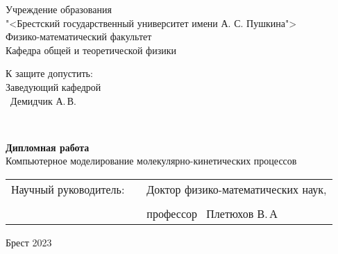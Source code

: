 \thispagestyle{empty}

\begin{center}
    Учреждение образования \\
"<Брестский государственный университет имени А. С. Пушкина"> \\
Физико-математический факультет \\
Кафедра общей и теоретической физики \\


    \vspace{20pt}
\end{center}

\begin{flushright}
    \begin{minipage}{0.4\textwidth}
      К защите допустить:\\[0.8em]
      Заведующий кафедрой \\[0.45em]
      \underline{\hspace*{2.8cm}}~Демидчик А.\,В.
    \end{minipage}\\[2.2em]
    
  \end{flushright}

\vspace{50pt}
  \begin{center}
    \textbf{Дипломная работа} \\  
    \vspace{20pt}
  Компьютерное моделирование молекулярно-кинетических процессов
  
\end{center}
\vfill
    \vspace{20 pt}


\vspace{20 pt}
 \noindent
 \begin{tabular}{lp{4em}l}
   Научный руководитель:   &&  Доктор физико-математических наук, \\ \\
                          &&   профессор \hrulefill  ~Плетюхов В.\,А
 \end{tabular}
 \vfill
  
 \begin{center}
    {\normalsize Брест 2023}
  \end{center}
